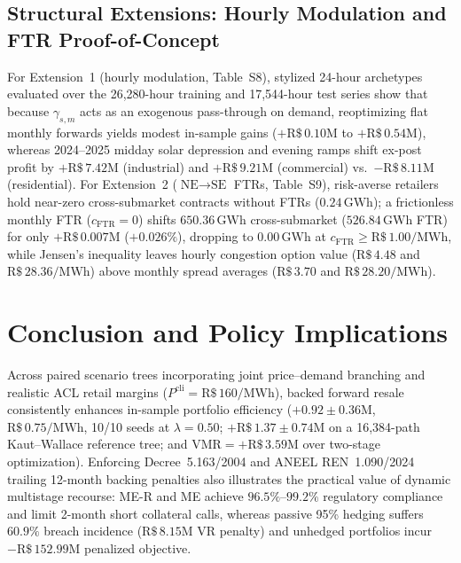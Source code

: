 \documentclass[10pt,journal]{IEEEtran}
\begin{document}
\subsection{Structural Extensions: Hourly Modulation and FTR Proof-of-Concept}
\label{sec:ext_res}
For Extension~1 (hourly modulation, Table~S8), stylized 24-hour archetypes evaluated over the 26,280-hour training and 17,544-hour test series show that because $\gamma_{s,m}$ acts as an exogenous pass-through on demand, reoptimizing flat monthly forwards yields modest in-sample gains ($+\text{R\$}\,0.10\text{M}$ to $+\text{R\$}\,0.54\text{M}$), whereas 2024--2025 midday solar depression and evening ramps shift ex-post profit by $+\text{R\$}\,7.42\text{M}$ (industrial) and $+\text{R\$}\,9.21\text{M}$ (commercial) vs.\ $-\text{R\$}\,8.11\text{M}$ (residential). For Extension~2 ($\text{NE}\to\text{SE}$ FTRs, Table~S9), risk-averse retailers hold near-zero cross-submarket contracts without FTRs ($0.24\,\text{GWh}$); a frictionless monthly FTR ($c_{\text{FTR}} = 0$) shifts $650.36\,\text{GWh}$ cross-submarket ($526.84\,\text{GWh}$ FTR) for only $+\text{R\$}\,0.007\text{M}$ ($+0.026\%$), dropping to $0.00\,\text{GWh}$ at $c_{\text{FTR}} \ge \text{R\$}\,1.00/\text{MWh}$, while Jensen's inequality leaves hourly congestion option value ($\text{R\$}\,4.48$ and $\text{R\$}\,28.36/\text{MWh}$) above monthly spread averages ($\text{R\$}\,3.70$ and $\text{R\$}\,28.20/\text{MWh}$).

\section{Conclusion and Policy Implications}
\label{sec:conclusion}

Across paired scenario trees incorporating joint price--demand branching and realistic ACL retail margins ($P^{\text{cli}} = \text{R\$}\,160/\text{MWh}$), backed forward resale consistently enhances in-sample portfolio efficiency ($+0.92 \pm 0.36\text{M}$, $\text{R\$}\,0.75/\text{MWh}$, 10/10 seeds at $\lambda = 0.50$; $+\text{R\$}\,1.37 \pm 0.74\text{M}$ on a 16,384-path Kaut--Wallace reference tree; and $\mathrm{VMR} = +\text{R\$}\,3.59\text{M}$ over two-stage optimization). Enforcing Decree~5.163/2004 and ANEEL REN~1.090/2024 trailing 12-month backing penalties also illustrates the practical value of dynamic multistage recourse: ME-R and ME achieve $96.5\%$--$99.2\%$ regulatory compliance and limit 2-month short collateral calls, whereas passive 95\% hedging suffers $60.9\%$ breach incidence ($\text{R\$}\,8.15\text{M}$ VR penalty) and unhedged portfolios incur $-\text{R\$}\,152.99\text{M}$ penalized objective.
\end{document}
